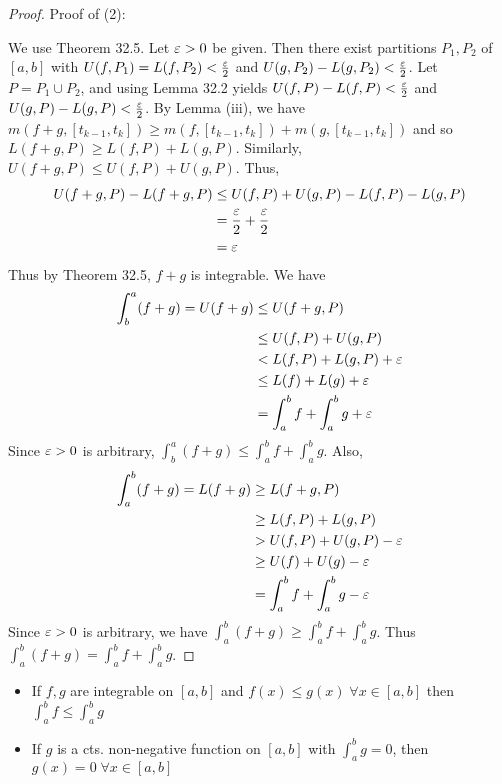 \documentclass{article}
\begin{document}
  \begin{proof}
    Proof of (2):

    We use Theorem 32.5. Let $\varepsilon > 0$ be given. Then there exist partitions $P_1, P_2$ of $[a, b]$ with $U(f, P_1) = L(f, P_2) < \frac{\varepsilon}{2}$ and $U(g, P_2) - L(g, P_2) < \frac{\varepsilon}{2}$. Let $P = P_1 \cup P_2$, and using Lemma 32.2 yields $U(f, P) - L(f, P) < \frac{\varepsilon}{2}$ and $U(g, P) - L(g, P) < \frac{\varepsilon}{2}$. By Lemma (iii), we have $m(f + g, [t_{k-1}, t_k]) \geq m(f, [t_{k-1}, t_k]) + m(g, [t_{k-1}, t_k])$ and so $L(f+g, P) \geq L(f, P) + L(g, P)$.
    Similarly, $U(f + g, P) \leq U(f, P) + U(g, P)$. Thus,
    \begin{align*}
      U(f + g, P) - L(f + g, P) &\leq U(f, P) + U(g, P) - L(f, P) - L(g, P)\\
      &= \frac{\varepsilon}{2} + \frac{\varepsilon}{2}\\
      &= \varepsilon
    \end{align*}
    Thus by Theorem 32.5, $f + g$ is integrable.
    We have
    \begin{align*}
      \int_b^a (f + g) = U(f + g) &\leq U(f + g, P)\\
      &\leq U(f, P) + U(g, P)\\
      &< L(f, P) + L(g, P) + \varepsilon\\
      &\leq L(f) + L(g) + \varepsilon\\
      &= \int_a^b f + \int_a^b g + \varepsilon\\
    \end{align*}
    Since $\varepsilon > 0$ is arbitrary, $\int_b^a (f +g) \leq \int_a^b f + \int_a^b g$.
    Also,
    \begin{align*}
      \int_a^b (f + g) = L(f+g) &\geq L(f + g, P)\\
      &\geq L(f, P) + L(g, P)\\
      &> U(f, P) + U(g, P) - \varepsilon\\
      &\geq U(f) + U(g) - \varepsilon\\
      &= \int_a^b f + \int_a^b g - \varepsilon\\
    \end{align*}
    Since $\varepsilon > 0$ is arbitrary, we have $\int_a^b (f+g) \geq \int_a^b f + \int_a^b g$.
    Thus $\int_a^b (f+g) = \int_a^b f + \int_a^b g$.
  \end{proof}
  \begin{cthm}[Theorem 33.4]
    \begin{itemize}
      \item If $f, g$ are integrable on $[a, b]$ and $f(x) \leq g(x) \; \forall x \in [a, b]$ then $\int_a^b f \leq \int_a^b g$
      \item If $g$ is a cts. non-negative function on $[a, b]$ with $\int_a^b g = 0$, then $g(x) = 0 \; \forall x \in [a, b]$
    \end{itemize}
  \end{cthm}
\end{document}
